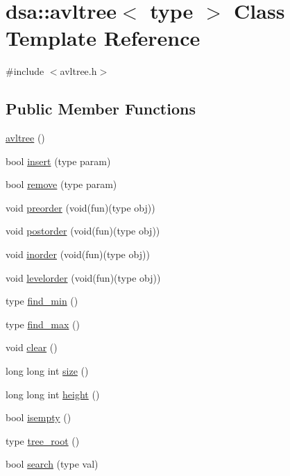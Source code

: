 \hypertarget{classdsa_1_1avltree}{}\section{dsa\+:\+:avltree$<$ type $>$ Class Template Reference}
\label{classdsa_1_1avltree}


{\ttfamily \#include $<$avltree.\+h$>$}

\subsection*{Public Member Functions}
\begin{DoxyCompactItemize}
\item 
\hyperlink{classdsa_1_1avltree_a10f51ac92b73ff9aab1d4f45c8c11b62}{avltree} ()
\item 
bool \hyperlink{classdsa_1_1avltree_ae0870d526ce23809197849982201a627}{insert} (type param)
\item 
bool \hyperlink{classdsa_1_1avltree_a03a92b3dda2de7ec12df47991d0fa9a8}{remove} (type param)
\item 
void \hyperlink{classdsa_1_1avltree_aea5e257512f23ac333157971c453de5f}{preorder} (void(fun)(type obj))
\item 
void \hyperlink{classdsa_1_1avltree_afee1fb6e6a1cae480fd2e137c3dc7b49}{postorder} (void(fun)(type obj))
\item 
void \hyperlink{classdsa_1_1avltree_a844836a7a954012f4b1bcf06df0216f6}{inorder} (void(fun)(type obj))
\item 
void \hyperlink{classdsa_1_1avltree_a0e22ff38e8d4bb79a87b741c866265ad}{levelorder} (void(fun)(type obj))
\item 
type \hyperlink{classdsa_1_1avltree_a801a0e944240b9d81e0b7740c28497a2}{find\+\_\+min} ()
\item 
type \hyperlink{classdsa_1_1avltree_aa170008a1add4f68d635a59dc24a54ca}{find\+\_\+max} ()
\item 
void \hyperlink{classdsa_1_1avltree_a8765b9d058a0121f8849ce2d291cb0b0}{clear} ()
\item 
long long int \hyperlink{classdsa_1_1avltree_ac05be211017bd9d3e8b4bf41209827ef}{size} ()
\item 
long long int \hyperlink{classdsa_1_1avltree_a77dcf1194d7ca69fd46d9c2b893ca458}{height} ()
\item 
bool \hyperlink{classdsa_1_1avltree_ad2961acd22cdf2f68902de075cac05a6}{isempty} ()
\item 
type \hyperlink{classdsa_1_1avltree_a9182a53d01531f96f0e63bea162c5d11}{tree\+\_\+root} ()
\item 
bool \hyperlink{classdsa_1_1avltree_aa56520d21d8abf3eaf67acb8ddd9c981}{search} (type val)
\end{DoxyCompactItemize}


